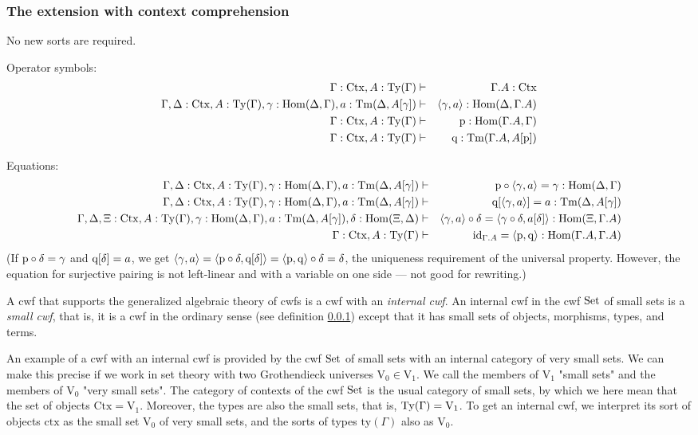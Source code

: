\documentclass{lmcs}
\def\V{\mathrm{V}}
\def\Ctx{\mathrm{Ctx}}
\def\Hom{\mathrm{Hom}}
\def\id{\mathrm{id}}
\newcommand{\ctx}{\mathrm{ctx}}
\newcommand{\ty}{\mathrm{ty}}
\begin{document}
\subsubsection{The extension with context comprehension}

No new sorts are required.
  
Operator symbols:
\begin{eqnarray*}
\Gamma : \Ctx, A:\Ty(\Gamma) &\vdash& \Gamma\cext A : \Ctx\\
\Gamma,\Delta : \Ctx, A:\Ty(\Gamma), \gamma : \Hom(\Delta,\Gamma), a:\Tm(\Delta,A[\gamma]) &\vdash& \tuple{\gamma,a} : \Hom(\Delta,\Gamma\cext A)\\
\Gamma : \Ctx, A:\Ty(\Gamma) &\vdash& \p: \Hom(\Gamma\cext A,\Gamma)\\
\Gamma : \Ctx, A:\Ty(\Gamma) &\vdash& \q: \Tm(\Gamma\cext A,A[\p])
\end{eqnarray*}

Equations:
\begin{eqnarray*}
\Gamma,\Delta : \Ctx, A:\Ty(\Gamma), \gamma : \Hom(\Delta,\Gamma), a:\Tm(\Delta,A[\gamma]) &\vdash& \p\circ\tuple{\gamma,a} = \gamma : \Hom(\Delta,\Gamma)\\
\Gamma,\Delta : \Ctx, A:\Ty(\Gamma), \gamma : \Hom(\Delta,\Gamma), a:\Tm(\Delta,A[\gamma]) &\vdash& \q[\tuple{\gamma,a}] = a : \Tm(\Delta,A[\gamma]) \\
\Gamma,\Delta,\Xi : \Ctx, A:\Ty(\Gamma), \gamma : \Hom(\Delta,\Gamma), a:\Tm(\Delta,A[\gamma]), \delta : \Hom(\Xi,\Delta) &\vdash& 
\tuple{\gamma,a} \circ \delta = \tuple{\gamma\circ\delta,a[\delta]} : 
\Hom(\Xi,\Gamma\cext A) \\
\Gamma : \Ctx, A:\Ty(\Gamma) &\vdash& 
\id_{\Gamma\cext A} = \tuple{\p,\q} : \Hom(\Gamma\cext A,\Gamma\cext A)
\end{eqnarray*}
(If $\mathrm{p}\circ\delta = \gamma$ and $\mathrm{q}[\delta]=a$, we get
$\langle \gamma,a \rangle=\langle \mathrm{p}\circ\delta, \mathrm{q}[\delta] \rangle = \langle \mathrm{p},\mathrm{q} \rangle\circ\delta =
\delta$, the uniqueness requirement of the universal property.
However, the equation for surjective pairing is not left-linear and with
a variable on one side --- not good for rewriting.)

A cwf that supports the generalized algebraic theory of cwfs is a cwf with an {\em internal cwf}. An internal cwf in the cwf ${\rm Set}$ of small sets is a {\em small cwf}, that is, it is a cwf in the ordinary sense (see definition \ref{}) except that it has small sets of objects, morphisms, types, and terms.

An example of a cwf with an internal cwf is provided by the cwf ${\rm Set}$ of small sets with an internal category of very small sets. We can make this precise if we work in set theory with two Grothendieck universes $\V_0 \in \V_1$. We call the members of $\V_1$ "small sets" and the members of $\V_0$ "very small sets". The category of contexts of the cwf ${\rm Set}$ is the usual category of small sets, by which we here mean that the set of objects $\Ctx = \V_1$. Moreover, the types are also the small sets, that is, $\Ty(\Gamma) = \V_1$. To get an internal cwf, we interpret its sort of objects $\ctx$ as the small set $\V_0$ of very small sets, and the sorts of types $\ty(\Gamma)$ also as $\V_0$.
\end{document}
